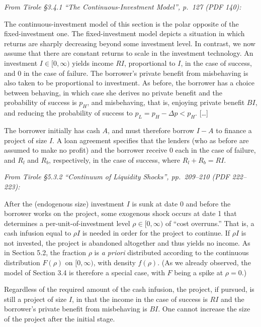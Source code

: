 \documentclass[11pt,a4paper]{article}
\begin{document}
\emph{From Tirole §3.4.1 ``The Continuous-Investment Model'', p.~127 (PDF 140):}

The continuous-investment model of this section is the polar opposite of the fixed-investment one.
The fixed-investment model depicts a situation in which returns are sharply decreasing beyond some
investment level. In contrast, we now assume that there are constant returns to scale in the
investment technology. An investment \(I \in [0, \infty)\) yields income \(RI\), proportional to
\(I\), in the case of success, and 0 in the case of failure. The borrower's private benefit from
misbehaving is also taken to be proportional to investment. As before, the borrower has a choice
between behaving, in which case she derives no private benefit and the probability of success is
\(p_H\), and misbehaving, that is, enjoying private benefit \(BI\), and reducing the probability of
success to \(p_L = p_H - \Delta p < p_H\). {[}\ldots{]}

The borrower initially has cash \(A\), and must therefore borrow \(I - A\) to finance a project of
size \(I\). A loan agreement specifies that the lenders (who as before are assumed to make no
profit) and the borrower receive 0 each in the case of failure, and \(R_l\) and \(R_b\),
respectively, in the case of success, where \(R_l + R_b = RI\).

\emph{From Tirole §5.3.2 ``Continuum of Liquidity Shocks'', pp.~209--210 (PDF 222--223):}

After the (endogenous size) investment \(I\) is sunk at date 0 and before the borrower works on the
project, some exogenous shock occurs at date 1 that determines a per-unit-of-investment level
\(\rho \in [0, \infty)\) of ``cost overruns.'' That is, a cash infusion equal to \(\rho I\) is
needed in order for the project to continue. If \(\rho I\) is not invested, the project is abandoned
altogether and thus yields no income. As in Section 5.2, the fraction \(\rho\) is \emph{a priori}
distributed according to the continuous distribution \(F(\rho)\) on \([0, \infty)\), with density
\(f(\rho)\). (As we already observed, the model of Section 3.4 is therefore a special case, with
\(F\) being a spike at \(\rho = 0\).)

Regardless of the required amount of the cash infusion, the project, if pursued, is still a project
of size \(I\), in that the income in the case of success is \(RI\) and the borrower's private
benefit from misbehaving is \(BI\). One cannot increase the size of the project after the initial
stage.
\end{document}
